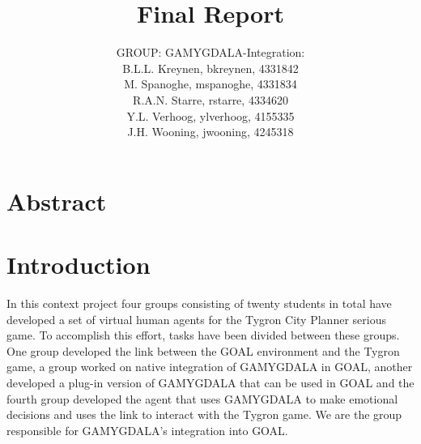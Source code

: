 \documentclass[11pt]{article}
\title{Final Report}
\author{GROUP: GAMYGDALA-Integration:\\
	B.L.L. Kreynen, bkreynen, 4331842\\
	M. Spanoghe, mspanoghe, 4331834\\
	R.A.N. Starre, rstarre, 4334620\\
	Y.L. Verhoog, ylverhoog, 4155335\\
	J.H. Wooning, jwooning, 4245318\\
}
\begin{document}
\maketitle
\pagebreak
\tableofcontents
\pagebreak
\section{Abstract}

\clearpage

\section{Introduction}
In this context project four groups consisting of twenty students in total have developed a set of virtual human \gls{agent}s for the Tygron\cite{Tygron} City Planner serious game. To accomplish this effort, tasks have been divided between these groups. One group developed the link between the \gls{GOAL}\cite{GOAL} environment and the Tygron game, a group worked on native integration of \gls{GAMYGDALA}\cite{GAMYGDALA} in GOAL, another developed a plug-in version of GAMYGDALA that can be used in GOAL and the fourth group developed the \gls{agent} that uses GAMYGDALA to make emotional decisions and uses the link to interact with the Tygron game. We are the group responsible for GAMYGDALA's integration into GOAL. 
\end{document}
